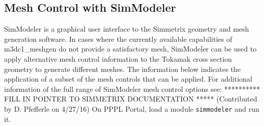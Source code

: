 \subsection{Mesh Control with SimModeler}
SimModeler is a graphical user interface to the Simmetrix geometry and mesh generation software. In cases where the currently available capabilities of m3dc1\_meshgen do not provide a satisfactory mesh, SimModeler can be used to apply alternative mesh control information to the Tokamak cross section geometry to generate different meshes. The information below indicates the application of a subset of the mesh controls that can be applied. For additional information of the full range of SimModeler mesh control options see: ********** FILL IN POINTER TO SIMMETRIX DOCUMENTATION *****
\label{ch:simmodeler}
(Contributed by D. Pfefferle on 4/27/16) On PPPL Portal, load a module \texttt{simmodeler} and run it.
